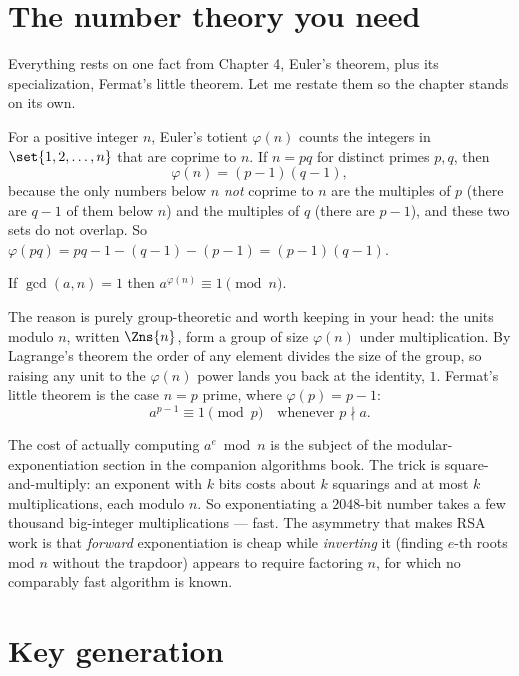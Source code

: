 \section{The number theory you need}
\label{ch19:numbertheory}

Everything rests on one fact from Chapter 4, Euler's theorem, plus its specialization, Fermat's little theorem. Let me restate them so the chapter stands on its own.

For a positive integer $n$, Euler's totient $\varphi(n)$ counts the integers in $\set{1,2,\dots,n}$ that are coprime to $n$. If $n=pq$ for distinct primes $p,q$, then
\[
  \varphi(n) = (p-1)(q-1),
\]
because the only numbers below $n$ \emph{not} coprime to $n$ are the multiples of $p$ (there are $q-1$ of them below $n$) and the multiples of $q$ (there are $p-1$), and these two sets do not overlap. So $\varphi(pq) = pq - 1 - (q-1) - (p-1) = (p-1)(q-1)$.

\begin{theorem}[Euler]
\label{ch19:euler}
If $\gcd(a,n)=1$ then $a^{\varphi(n)} \equiv 1 \pmod{n}$.
\end{theorem}

The reason is purely group-theoretic and worth keeping in your head: the units modulo $n$, written $\Zns{n}$, form a group of size $\varphi(n)$ under multiplication. By Lagrange's theorem the order of any element divides the size of the group, so raising any unit to the $\varphi(n)$ power lands you back at the identity, $1$. Fermat's little theorem is the case $n=p$ prime, where $\varphi(p)=p-1$:
\[
  a^{p-1}\equiv 1 \pmod p \quad\text{whenever } p\nmid a.
\]

\begin{connectionbox}
The cost of actually computing $a^e \bmod n$ is the subject of the modular-exponentiation section in the companion algorithms book. The trick is square-and-multiply: an exponent with $k$ bits costs about $k$ squarings and at most $k$ multiplications, each modulo $n$. So exponentiating a $2048$-bit number takes a few thousand big-integer multiplications --- fast. The asymmetry that makes RSA work is that \emph{forward} exponentiation is cheap while \emph{inverting} it (finding $e$-th roots mod $n$ without the trapdoor) appears to require factoring $n$, for which no comparably fast algorithm is known.
\end{connectionbox}

\section{Key generation}
\label{ch19:keygen}

